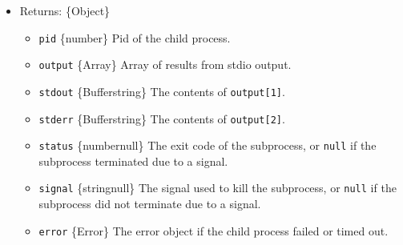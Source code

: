 \begin{itemize}
\begin{itemize}
    \texttt{encoding} \{string\} The encoding used for all stdio inputs
    and outputs. \textbf{Default:}
    \texttt{\textquotesingle{}buffer\textquotesingle{}}.
  \item
    \texttt{shell} \{boolean\textbar string\} If \texttt{true}, runs
    \texttt{command} inside of a shell. Uses
    \texttt{\textquotesingle{}/bin/sh\textquotesingle{}} on Unix, and
    \texttt{process.env.ComSpec} on Windows. A different shell can be
    specified as a string. See \hyperref[shell-requirements]{Shell
    requirements} and \hyperref[default-windows-shell]{Default Windows
    shell}. \textbf{Default:} \texttt{false} (no shell).
  \item
    \texttt{windowsVerbatimArguments} \{boolean\} No quoting or escaping
    of arguments is done on Windows. Ignored on Unix. This is set to
    \texttt{true} automatically when \texttt{shell} is specified and is
    CMD. \textbf{Default:} \texttt{false}.
  \item
    \texttt{windowsHide} \{boolean\} Hide the subprocess console window
    that would normally be created on Windows systems. \textbf{Default:}
    \texttt{false}.
  \end{itemize}
\item
  Returns: \{Object\}

  \begin{itemize}
  \tightlist
  \item
    \texttt{pid} \{number\} Pid of the child process.
  \item
    \texttt{output} \{Array\} Array of results from stdio output.
  \item
    \texttt{stdout} \{Buffer\textbar string\} The contents of
    \texttt{output{[}1{]}}.
  \item
    \texttt{stderr} \{Buffer\textbar string\} The contents of
    \texttt{output{[}2{]}}.
  \item
    \texttt{status} \{number\textbar null\} The exit code of the
    subprocess, or \texttt{null} if the subprocess terminated due to a
    signal.
  \item
    \texttt{signal} \{string\textbar null\} The signal used to kill the
    subprocess, or \texttt{null} if the subprocess did not terminate due
    to a signal.
  \item
    \texttt{error} \{Error\} The error object if the child process
    failed or timed out.
  \end{itemize}
\end{itemize}

